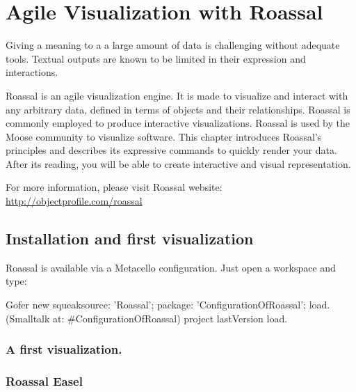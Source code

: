 \documentclass[a4paper,10pt,twoside]{book}
\begin{document}
\fi
\sloppy
\chapter{Agile Visualization with Roassal}


Giving a meaning to a a large amount of data is challenging without adequate tools. Textual outputs are known to be limited in their expression and interactions. 

Roassal is an agile visualization engine. It is made to visualize and interact with any arbitrary data, defined in terms of objects and their relationships. Roassal is commonly employed to produce interactive visualizations. Roassal is used by the Moose community to visualize software. This chapter introduces Roassal's principles and describes its expressive commands to quickly render your data. After its reading, you will be able to create interactive and visual representation.

For more information, please visit Roassal website: \url{http://objectprofile.com/roassal}

\section{Installation and first visualization}

Roassal is available via a Metacello configuration. Just open a workspace and type:

\begin{code}{}
Gofer new
	squeaksource: 'Roassal'; 
	package: 'ConfigurationOfRoassal';
	load.
(Smalltalk at: #ConfigurationOfRoassal) project lastVersion load.
\end{code}


\subsection{A first visualization.}



\subsection{Roassal Easel}
\end{document}
